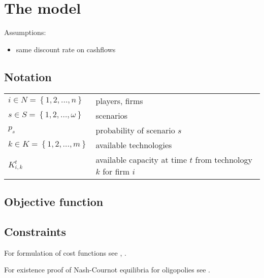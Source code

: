 \section{The model}

Assumptions:

\begin{itemize}
	\item same discount rate on cashflows
\end{itemize}

\subsection{Notation}

\begin{longtable}[c]{l l}
$i\in N=\left\{ 1,2,\dots,n\right\}$ & players, firms\\
$s\in S=\left\{ 1,2,\dots,\omega\right\}$ & scenarios\\
$p_s$ & probability of scenario $s$\\
$k\in K=\left\{ 1,2,\dots,m\right\}$ & available technologies\\
$K_{i,k}^t$ & available capacity at time $t$ from technology $k$ for firm $i$ 
\end{longtable}

\subsection{Objective function}

\subsection{Constraints}

For formulation of cost functions see \cite{Bergman1995}, \cite{Pineau2003}.	

For existence proof of Nash-Cournot equilibria for oligopolies see \cite{Murphy1982}.




